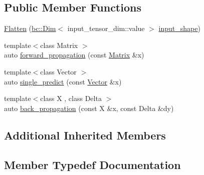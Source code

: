 \subsection*{Public Member Functions}
\begin{DoxyCompactItemize}
\item 
\hyperlink{structbc_1_1nn_1_1Flatten_a89db66a90f1de37dce20b230c631199c}{Flatten} (\hyperlink{structbc_1_1Dim}{bc\+::\+Dim}$<$ input\+\_\+tensor\+\_\+dim\+::value $>$ \hyperlink{classbc_1_1nn_1_1Layer__Input__Base_ab7d41ba8f59817a76ceecd13b47f101a}{input\+\_\+shape})
\item 
{\footnotesize template$<$class Matrix $>$ }\\auto \hyperlink{structbc_1_1nn_1_1Flatten_af1e268a0fbb0cd6a6ccd7bfc5f9ca234}{forward\+\_\+propagation} (const \hyperlink{namespacebc_a92dd1e243183b382432a5fac3ed8b89f}{Matrix} \&x)
\item 
{\footnotesize template$<$class Vector $>$ }\\auto \hyperlink{structbc_1_1nn_1_1Flatten_a0d46bfe5ed2d540c9f9ef355c1704585}{single\+\_\+predict} (const \hyperlink{namespacebc_a14d40e8e95957f92a57853921837a15d}{Vector} \&x)
\item 
{\footnotesize template$<$class X , class Delta $>$ }\\auto \hyperlink{structbc_1_1nn_1_1Flatten_aec50c8f60d24fbac0cbd9fe98d4a3d1d}{back\+\_\+propagation} (const X \&x, const Delta \&dy)
\end{DoxyCompactItemize}
\subsection*{Additional Inherited Members}


\subsection{Member Typedef Documentation}
\mbox{\label{structbc_1_1nn_1_1Flatten_aac419d81dc54ef6d11b042a0ad05cc11}} 

